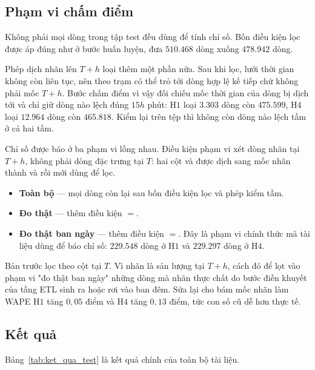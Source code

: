 \FloatBarrier
\subsection{Phạm vi chấm điểm}

Không phải mọi dòng trong tập test đều dùng để tính chỉ số. Bốn điều kiện lọc được áp đúng như
ở bước huấn luyện, đưa $510.468$ dòng xuống $478.942$ dòng.

Phép dịch nhãn lên $T{+}h$ loại thêm một phần nữa. Sau khi lọc, lưới thời gian không còn liên
tục, nên  theo trạm có thể trỏ tới dòng hợp lệ kế tiếp chứ không phải mốc
$T{+}h$. Bước chấm điểm vì vậy đối chiếu mốc thời gian của dòng bị dịch tới và chỉ giữ dòng
nào lệch đúng $15h$ phút: H$1$ loại $3.303$ dòng còn $\mathbf{475.599}$, H$4$ loại $12.964$
dòng còn $\mathbf{465.818}$. Kiểm lại trên tệp  thì không còn
dòng nào lệch tầm ở cả hai tầm.

Chỉ số được báo ở ba phạm vi lồng nhau. Điều kiện phạm vi xét dòng nhãn tại $T{+}h$,
không phải dòng đặc trưng tại $T$: hai cột  và  được dịch
sang mốc nhãn thành  và  rồi mới dùng để lọc.

\begin{itemize}
    \item \textbf{Toàn bộ} --- mọi dòng còn lại sau bốn điều kiện lọc và phép kiểm tầm.
    \item \textbf{Đo thật} --- thêm điều kiện ${}={}$.
    \item \textbf{Đo thật ban ngày} --- thêm điều kiện ${}={}$. Đây là
    phạm vi chính thức mà tài liệu dùng để báo chỉ số: $229.548$ dòng ở H$1$ và $229.297$ dòng
    ở H$4$.
\end{itemize}

Bản trước lọc theo cột tại $T$. Vì nhãn là sản lượng tại $T{+}h$, cách đó để lọt vào phạm vi
"đo thật ban ngày" những dòng mà nhãn thực chất do bước điền khuyết của tầng ETL sinh ra hoặc
rơi vào ban đêm. Sửa lại cho bám mốc nhãn làm WAPE H$1$ tăng $0{,}05$ điểm và H$4$ tăng
$0{,}13$ điểm, tức con số cũ dễ hơn thực tế.

\FloatBarrier
\subsection{Kết quả}

Bảng~\ref{tab:ket_qua_test} là kết quả chính của toàn bộ tài liệu.

